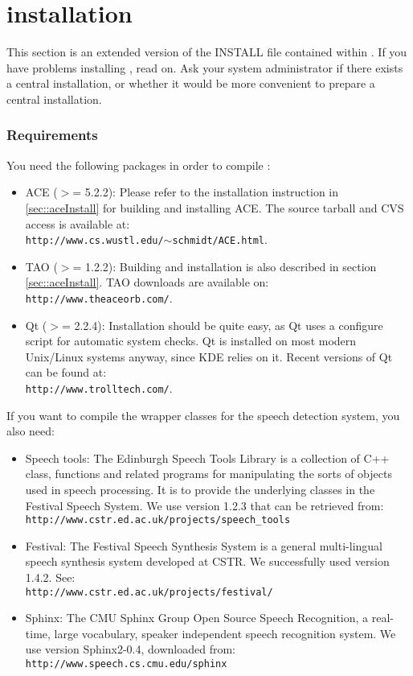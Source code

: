 \chapter{\miro installation}
\label{sec:miroInstall}

This section is an extended version of the INSTALL file contained
within \miro. If you have problems installing \miro, read on.  Ask
your system administrator if there exists a central installation, or
whether it would be more convenient to prepare a central installation.

\subsection{Requirements}

You need the following packages in order to compile \miro:
\begin{itemize}
\item ACE ($>$= 5.2.2): Please refer to the installation instruction
  in \ref{sec::aceInstall} for building and installing ACE. The source
  tarball and CVS access is available at:\\
  \texttt{http://www.cs.wustl.edu/$\sim$schmidt/ACE.html}.
\item TAO ($>$= 1.2.2): Building and installation is also described in
  section \ref{sec::aceInstall}. TAO downloads are available on:\\
  \texttt{http://www.theaceorb.com/}.
\item Qt ($>$= 2.2.4): Installation should be quite easy, as Qt uses a
  configure script for automatic system checks. Qt is installed on
  most modern Unix/Linux systems anyway, since KDE relies on
  it. Recent versions of Qt can be found at:\\
  \texttt{http://www.trolltech.com/}.
\end{itemize}

If you want to compile the wrapper classes for the speech detection
system, you also need:
\begin{itemize}
\item Speech tools: The Edinburgh Speech Tools Library is a collection
  of C++ class, functions and related programs for manipulating the
  sorts of objects used in speech processing. It is to provide the
  underlying classes in the Festival Speech System. We use version
  1.2.3 that can be retrieved from:\\
  \texttt{http://www.cstr.ed.ac.uk/projects/speech\_tools}
\item Festival: The Festival Speech Synthesis System is a general
  multi-lingual speech synthesis system developed at CSTR. We
  successfully used version 1.4.2. See:\\
  \texttt{http://www.cstr.ed.ac.uk/projects/festival/}
\item Sphinx: The CMU Sphinx Group Open Source Speech Recognition, a
  real-time, large vocabulary, speaker independent speech recognition
  system. We use version Sphinx2-0.4, downloaded from:\\
 \texttt{http://www.speech.cs.cmu.edu/sphinx}
\end{itemize}

